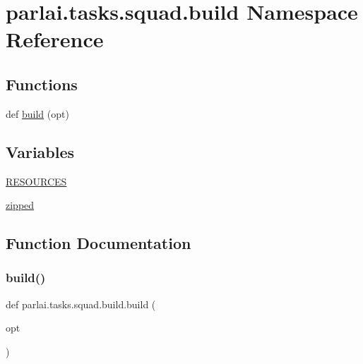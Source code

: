 \hypertarget{namespaceparlai_1_1tasks_1_1squad_1_1build}{}\section{parlai.\+tasks.\+squad.\+build Namespace Reference}
\label{namespaceparlai_1_1tasks_1_1squad_1_1build}
\subsection*{Functions}
\begin{DoxyCompactItemize}
\item 
def \hyperlink{namespaceparlai_1_1tasks_1_1squad_1_1build_aaf903c1fa0ac0b6cd2e9eb37d5d001a1}{build} (opt)
\end{DoxyCompactItemize}
\subsection*{Variables}
\begin{DoxyCompactItemize}
\item 
\hyperlink{namespaceparlai_1_1tasks_1_1squad_1_1build_a61589d585f7e9b43934aadf6ad9480f5}{R\+E\+S\+O\+U\+R\+C\+ES}
\item 
\hyperlink{namespaceparlai_1_1tasks_1_1squad_1_1build_af9fc1ae55cc97a4dd4ac6d92659e0389}{zipped}
\end{DoxyCompactItemize}


\subsection{Function Documentation}
\mbox{\label{namespaceparlai_1_1tasks_1_1squad_1_1build_aaf903c1fa0ac0b6cd2e9eb37d5d001a1}} 
\subsubsection{\texorpdfstring{build()}{build()}}
{\footnotesize\ttfamily def parlai.\+tasks.\+squad.\+build.\+build (\begin{DoxyParamCaption}\item[{}]{opt }\end{DoxyParamCaption})}



